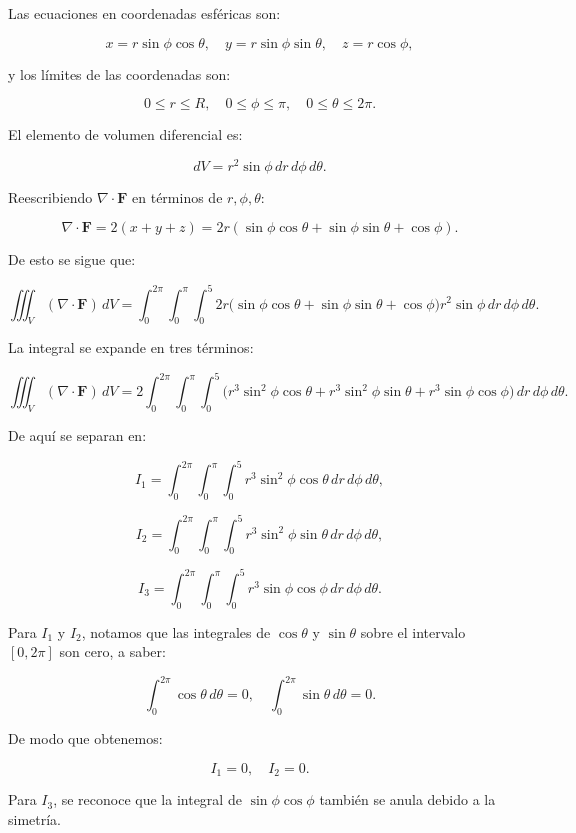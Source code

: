 \documentclass{report}
\begin{document}
Las ecuaciones en coordenadas esféricas son:

\[
x = r \sin \phi \cos \theta, \quad y = r \sin \phi \sin \theta, \quad z = r \cos \phi,
\]

y los límites de las coordenadas son:

\[
0 \leq r \leq R, \quad 0 \leq \phi \leq \pi, \quad 0 \leq \theta \leq 2\pi.
\]

El elemento de volumen diferencial es:

\[
dV = r^2 \sin \phi \, dr \, d\phi \, d\theta.
\]

Reescribiendo \( \nabla \cdot \mathbf{F} \) en términos de \( r, \phi, \theta \):

\[
\nabla \cdot \mathbf{F} = 2(x + y + z) = 2r (\sin \phi \cos \theta + \sin \phi \sin \theta + \cos \phi).
\]

De esto se sigue que:

\[
\iiint_V (\nabla \cdot \mathbf{F}) \, dV = \int_0^{2\pi} \int_0^\pi \int_0^5 2r \big(\sin \phi \cos \theta + \sin \phi \sin \theta + \cos \phi\big) r^2 \sin \phi \, dr \, d\phi \, d\theta.
\]


La integral se expande en tres términos:

\[
\iiint_V (\nabla \cdot \mathbf{F}) \, dV = 2 \int_0^{2\pi} \int_0^\pi \int_0^5 \big(r^3 \sin^2 \phi \cos \theta + r^3 \sin^2 \phi \sin \theta + r^3 \sin \phi \cos \phi\big) \, dr \, d\phi \, d\theta.
\]

De aquí se separan en:

\[
I_1 = \int_0^{2\pi} \int_0^\pi \int_0^5 r^3 \sin^2 \phi \cos \theta \, dr \, d\phi \, d\theta,
\]

\[
I_2 = \int_0^{2\pi} \int_0^\pi \int_0^5 r^3 \sin^2 \phi \sin \theta \, dr \, d\phi \, d\theta,
\]

\[
I_3 = \int_0^{2\pi} \int_0^\pi \int_0^5 r^3 \sin \phi \cos \phi \, dr \, d\phi \, d\theta.
\]


Para \( I_1 \) y \( I_2 \), notamos que las integrales de \( \cos \theta \) y \( \sin \theta \) sobre el intervalo \( [0, 2\pi] \) son cero, a saber:

\[
\int_0^{2\pi} \cos \theta \, d\theta = 0, \quad \int_0^{2\pi} \sin \theta \, d\theta = 0.
\]

De modo que obtenemos:

\[
I_1 = 0, \quad I_2 = 0.
\]

Para \( I_3 \), se reconoce que la integral de \( \sin \phi \cos \phi \) también se anula debido a la simetría.
\end{document}
